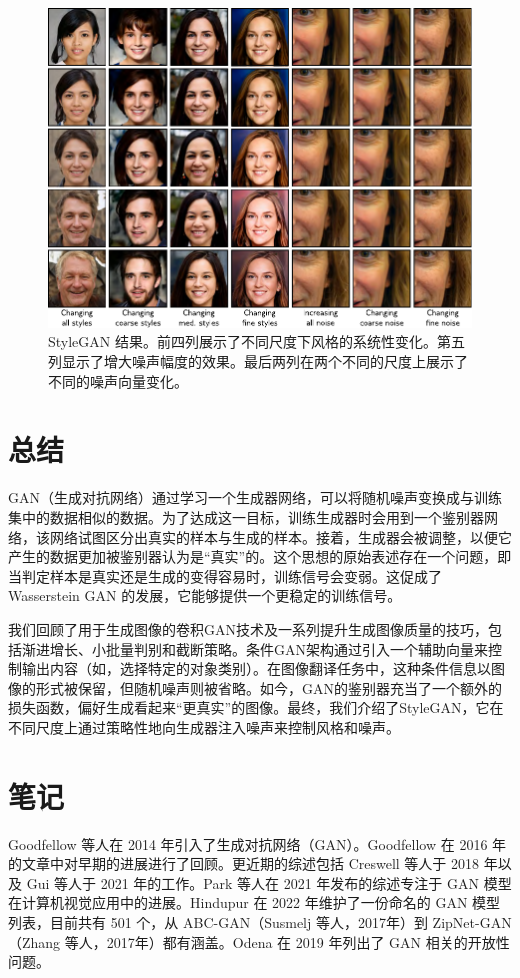 \documentclass[lang=cn,newtx,10pt,scheme=chinese]{elegantbook}
\begin{document}
\begin{figure}[ht!]
\centering
\includegraphics[width=0.7\linewidth]{PDFFigures/UDLChap15PDF/GANStyleGANResults_C.pdf}
\caption{StyleGAN 结果。前四列展示了不同尺度下风格的系统性变化。第五列显示了增大噪声幅度的效果。最后两列在两个不同的尺度上展示了不同的噪声向量变化。}
\end{figure}


\section{总结}
GAN（生成对抗网络）通过学习一个生成器网络，可以将随机噪声变换成与训练集中的数据相似的数据。为了达成这一目标，训练生成器时会用到一个鉴别器网络，该网络试图区分出真实的样本与生成的样本。接着，生成器会被调整，以便它产生的数据更加被鉴别器认为是“真实”的。这个思想的原始表述存在一个问题，即当判定样本是真实还是生成的变得容易时，训练信号会变弱。这促成了 Wasserstein GAN 的发展，它能够提供一个更稳定的训练信号。

我们回顾了用于生成图像的卷积GAN技术及一系列提升生成图像质量的技巧，包括渐进增长、小批量判别和截断策略。条件GAN架构通过引入一个辅助向量来控制输出内容（如，选择特定的对象类别）。在图像翻译任务中，这种条件信息以图像的形式被保留，但随机噪声则被省略。如今，GAN的鉴别器充当了一个额外的损失函数，偏好生成看起来“更真实”的图像。最终，我们介绍了StyleGAN，它在不同尺度上通过策略性地向生成器注入噪声来控制风格和噪声。

\section{笔记}
Goodfellow 等人在 2014 年引入了生成对抗网络（GAN）。Goodfellow 在 2016 年的文章中对早期的进展进行了回顾。更近期的综述包括 Creswell 等人于 2018 年以及 Gui 等人于 2021 年的工作。Park 等人在 2021 年发布的综述专注于 GAN 模型在计算机视觉应用中的进展。Hindupur 在 2022 年维护了一份命名的 GAN 模型列表，目前共有 501 个，从 ABC-GAN（Susmelj 等人，2017年）到 ZipNet-GAN（Zhang 等人，2017年）都有涵盖。Odena 在 2019 年列出了 GAN 相关的开放性问题。
\end{document}
